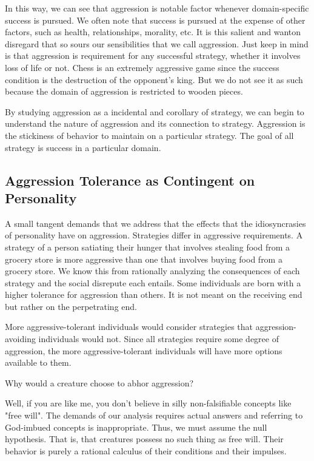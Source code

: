 \documentclass[12pt]{article}
\begin{document}
In this way, we can see that aggression is notable factor whenever domain-specific success is pursued.
We often note that success is pursued at the expense of other factors, such as health, relationships, morality, etc.
It is this salient and wanton disregard that so sours our sensibilities that we call aggression.
Just keep in mind is that aggression is requirement for any successful strategy, whether it involves loss of life or not.
Chess is an extremely aggressive game since the success condition is the destruction of the opponent's king.
But we do not see it as such because the domain of aggression is restricted to wooden pieces.

By studying aggression as a incidental and corollary of strategy, we can begin to understand the nature of aggression and its connection to strategy.
Aggression is the stickiness of behavior to maintain on a particular strategy.
The goal of all strategy is success in a particular domain.

\subsection{Aggression Tolerance as Contingent on Personality}
A small tangent demands that we address that the effects that the idiosyncrasies of personality have on aggression.
Strategies differ in aggressive requirements.
A strategy of a person satiating their hunger that involves stealing food from a grocery store is more aggressive than one that involves buying food from a grocery store.
We know this from rationally analyzing the consequences of each strategy and the social disrepute each entails.
Some individuals are born with a higher tolerance for aggression than others.
It is not meant on the receiving end but rather on the perpetrating end.

More aggressive-tolerant individuals would consider strategies that aggression-avoiding individuals would not.
Since all strategies require some degree of aggression, the more aggressive-tolerant individuals will have more options available to them.

Why would a creature choose to abhor aggression?

Well, if you are like me, you don't believe in silly non-falsifiable concepts like "free will".
The demands of our analysis requires actual answers and referring to God-imbued concepts is inappropriate.
Thus, we must assume the null hypothesis.
That is, that creatures possess no such thing as free will.
Their behavior is purely a rational calculus of their conditions and their impulses.
\end{document}
